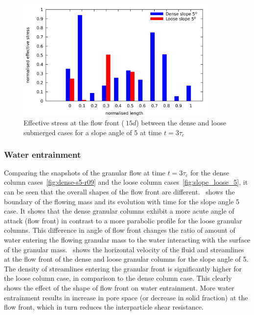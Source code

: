\documentclass[12pt,twoside]{tuhhproc-en}
\begin{document}
\begin{figure}[htpb]
\centering
\includegraphics[width=0.9\textwidth]{figs/slope-hydroplaning}
\caption{Effective stress at the flow front ($~15d$) between the dense and loose submerged cases for a slope angle of \si{5}{\degree} at time $t = 3\tau_c$}
\label{fig:slope-hydroplaning}
\end{figure}

\subsubsection{Water entrainment}
Comparing the snapshots of the granular flow at time $t=3\tau_c$ for the dense column cases~\cref{fig:dense-s5-r09} and the loose column cases~\cref{fig:slope_loose_5}, it can be seen that the overall shapes of the flow front are different.~ shows the boundary of the flowing mass and its evolution with time for the slope angle \si{5}{\degree} case. It shows that the dense granular columns exhibit a more acute angle of attack (flow front) in contrast to a more parabolic profile for the loose granular columns. This difference in angle of flow front changes the ratio of amount of water entering the flowing granular mass to the water interacting with the surface of the granular mass.~ shows the horizontal velocity of the fluid and streamlines at the flow front of the dense and loose granular columns for the slope angle of \si{5}{\degree}. The density of streamlines entering the granular front is significantly higher for the loose column case, in comparison to the dense column case. This clearly shows the effect of the shape of flow front on water entrainment. More water entrainment results in increase in pore space (or decrease in solid fraction) at the flow front, which in turn reduces the interparticle shear resistance. 
\end{document}
